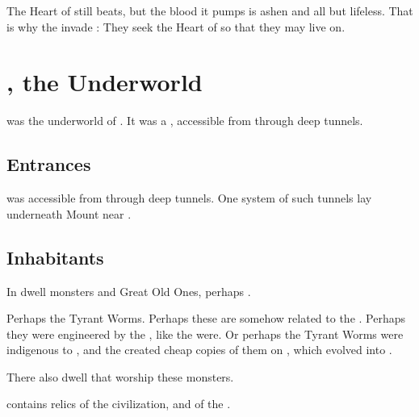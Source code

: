 The Heart of \Erebos{} still beats, but the blood it pumps is ashen and all but lifeless. 
That is why the \banes{} invade \Miith{}: 
They seek the Heart of \Miith{} so that they may live on. 















\section{\KaiLeng, the Underworld}
\index{\KaiLeng}
\KaiLeng{} was the underworld of \Miith{}. 
It was a , accessible from \Azmith{} through deep tunnels. 









\subsection{Entrances}
\KaiLeng was accessible from \Azmith{} through deep tunnels. 
One system of such tunnels lay underneath Mount  near . 









\subsection{Inhabitants}
In \KaiLeng dwell monsters and Great Old Ones, perhaps \xss. 

Perhaps the Tyrant Worms. 
Perhaps these are somehow related to the . 
Perhaps they were engineered by the \voyagers, like the \banes{} were. 
Or perhaps the Tyrant Worms were indigenous to \Miith{}, and the \voyagers{} created cheap copies of them on \Erebos, which evolved into \ghobaleth. 

There also dwell  that worship these monsters. 

\KaiLeng{} contains relics of the \psp{\voyagers} civilization, and of the \xss. 






